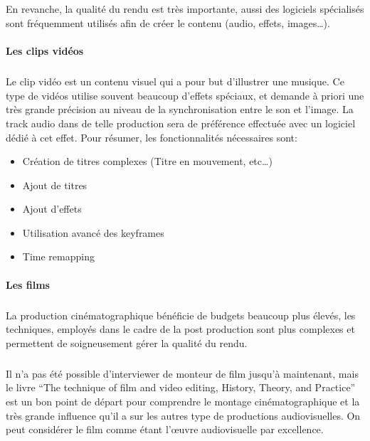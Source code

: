 \subparagraph{}

En revanche, la qualité du rendu est très importante, aussi des
logiciels spécialisés sont fréquemment utilisés afin de créer le
contenu (audio, effets, images\ldots).

\paragraph {Les clips vidéos}

\subparagraph{}

Le clip vidéo est un contenu visuel qui a pour but d'illustrer une
musique. Ce type de vidéos utilise souvent beaucoup d'effets spéciaux,
et demande à priori une très grande précision au niveau de la
synchronisation entre le son et l'image. La track audio dans de telle
production sera de préférence effectuée avec un logiciel dédié
à cet effet. Pour résumer, les fonctionnalités nécessaires sont:
\begin{itemize} \setlength{\itemsep}{2mm}
  \item{Création de titres complexes (Titre en mouvement, etc\ldots)}
  \item{Ajout de titres} \item{Ajout d'effets} \item{Utilisation avancé
  des keyframes} \item{Time remapping}
\end{itemize}

\paragraph {Les films}

\subparagraph{}

La production cinématographique bénéficie de budgets beaucoup plus
élevés, les techniques, employés dans le cadre de la post production
sont plus complexes et permettent de soigneusement gérer la qualité
du rendu.

\subparagraph{}

Il n'a pas été possible d'interviewer de monteur de film jusqu'à
maintenant, mais le livre ``The technique of film and video editing,
History, Theory, and Practice'' \cite{TheTechniqueOfFilmAndVideoEditing}
est un bon point de départ pour comprendre le montage cinématographique
et la très grande influence qu'il a sur les autres type de productions
audiovisuelles. On peut considérer le film comme étant l'œuvre
audiovisuelle par excellence. %

